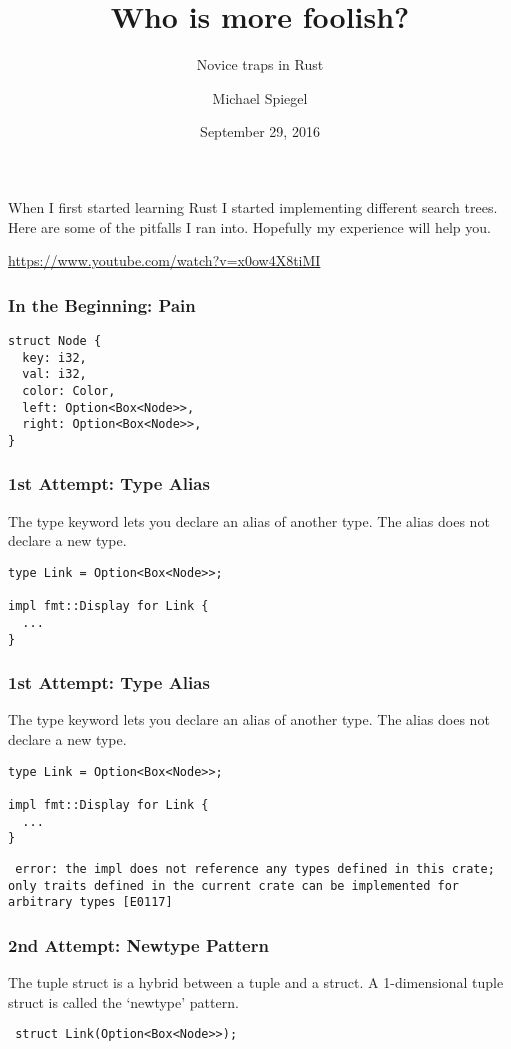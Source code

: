 \documentclass{beamer}
\title{Who is more foolish?}
\subtitle{Novice traps in Rust}
\author{Michael Spiegel}
\date{September 29, 2016}
\begin{document}
\begin{frame}
\titlepage
\end{frame}

\begin{frame}
When I first started learning Rust I started implementing different search trees.
Here are some of the pitfalls I ran into. Hopefully my experience will help you.

{\color{blue} \url{https://www.youtube.com/watch?v=x0ow4X8tiMI}}
\end{frame}

\begin{frame}[fragile]
\frametitle{In the Beginning: Pain}
\begin{verbatim}
struct Node {
  key: i32,
  val: i32,
  color: Color,
  left: Option<Box<Node>>,
  right: Option<Box<Node>>,
}
\end{verbatim}
\end{frame}

\begin{frame}[t,fragile]
\frametitle{1st Attempt: Type Alias}
The type keyword lets you declare an alias of another type. The alias does not declare a new type.
\begin{verbatim}
type Link = Option<Box<Node>>;

impl fmt::Display for Link {
  ... 
}
\end{verbatim}
\end{frame}

\begin{frame}[t,fragile]
\frametitle{1st Attempt: Type Alias}
The type keyword lets you declare an alias of another type. The alias does not declare a new type.
\begin{verbatim}
type Link = Option<Box<Node>>;

impl fmt::Display for Link {
  ... 
}
\end{verbatim}
{\scriptsize \texttt{{\color{red} error}: the impl does not reference any types defined in this crate; only traits defined in the current crate can be implemented for arbitrary types [E0117]}}
\end{frame}

\begin{frame}[t,fragile]
\frametitle{2nd Attempt: Newtype Pattern}
The tuple struct is a hybrid between a tuple and a struct. A 1-dimensional tuple struct is called the `newtype' pattern.
\begin{verbatim}
 struct Link(Option<Box<Node>>);
\end{verbatim}
\end{frame}
\end{document}
